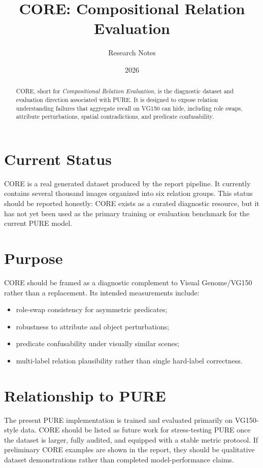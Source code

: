 \documentclass[11pt]{article}
\title{CORE: Compositional Relation Evaluation}
\author{Research Notes}
\date{2026}
\begin{document}
\maketitle

\begin{abstract}
CORE, short for \emph{Compositional Relation Evaluation}, is the diagnostic dataset and evaluation direction associated with PURE. It is designed to expose relation understanding failures that aggregate recall on VG150 can hide, including role swaps, attribute perturbations, spatial contradictions, and predicate confusability.
\end{abstract}

\section{Current Status}
CORE is a real generated dataset produced by the report pipeline. It currently contains several thousand images organized into six relation groups. This status should be reported honestly: CORE exists as a curated diagnostic resource, but it has not yet been used as the primary training or evaluation benchmark for the current PURE model.

\section{Purpose}
CORE should be framed as a diagnostic complement to Visual Genome/VG150 rather than a replacement. Its intended measurements include:
\begin{itemize}[leftmargin=1.5em]
  \item role-swap consistency for asymmetric predicates;
  \item robustness to attribute and object perturbations;
  \item predicate confusability under visually similar scenes;
  \item multi-label relation plausibility rather than single hard-label correctness.
\end{itemize}

\section{Relationship to PURE}
The present PURE implementation is trained and evaluated primarily on VG150-style data. CORE should be listed as future work for stress-testing PURE once the dataset is larger, fully audited, and equipped with a stable metric protocol. If preliminary CORE examples are shown in the report, they should be qualitative dataset demonstrations rather than completed model-performance claims.
\end{document}
